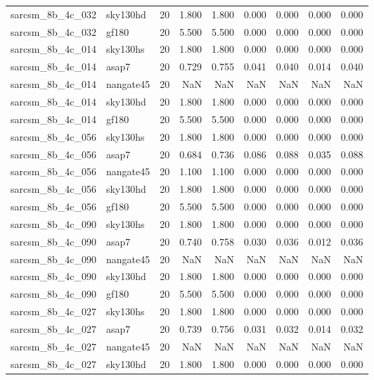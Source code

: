 \begin{tabular}{llrrrrrrr}
sarcsm\_8b\_4c\_032 & sky130hd & 20 & 1.800 & 1.800 & 0.000 & 0.000 & 0.000 & 0.000 \\
sarcsm\_8b\_4c\_032 & gf180 & 20 & 5.500 & 5.500 & 0.000 & 0.000 & 0.000 & 0.000 \\
sarcsm\_8b\_4c\_014 & sky130hs & 20 & 1.800 & 1.800 & 0.000 & 0.000 & 0.000 & 0.000 \\
sarcsm\_8b\_4c\_014 & asap7 & 20 & 0.729 & 0.755 & 0.041 & 0.040 & 0.014 & 0.040 \\
sarcsm\_8b\_4c\_014 & nangate45 & 20 & NaN & NaN & NaN & NaN & NaN & NaN \\
sarcsm\_8b\_4c\_014 & sky130hd & 20 & 1.800 & 1.800 & 0.000 & 0.000 & 0.000 & 0.000 \\
sarcsm\_8b\_4c\_014 & gf180 & 20 & 5.500 & 5.500 & 0.000 & 0.000 & 0.000 & 0.000 \\
sarcsm\_8b\_4c\_056 & sky130hs & 20 & 1.800 & 1.800 & 0.000 & 0.000 & 0.000 & 0.000 \\
sarcsm\_8b\_4c\_056 & asap7 & 20 & 0.684 & 0.736 & 0.086 & 0.088 & 0.035 & 0.088 \\
sarcsm\_8b\_4c\_056 & nangate45 & 20 & 1.100 & 1.100 & 0.000 & 0.000 & 0.000 & 0.000 \\
sarcsm\_8b\_4c\_056 & sky130hd & 20 & 1.800 & 1.800 & 0.000 & 0.000 & 0.000 & 0.000 \\
sarcsm\_8b\_4c\_056 & gf180 & 20 & 5.500 & 5.500 & 0.000 & 0.000 & 0.000 & 0.000 \\
sarcsm\_8b\_4c\_090 & sky130hs & 20 & 1.800 & 1.800 & 0.000 & 0.000 & 0.000 & 0.000 \\
sarcsm\_8b\_4c\_090 & asap7 & 20 & 0.740 & 0.758 & 0.030 & 0.036 & 0.012 & 0.036 \\
sarcsm\_8b\_4c\_090 & nangate45 & 20 & NaN & NaN & NaN & NaN & NaN & NaN \\
sarcsm\_8b\_4c\_090 & sky130hd & 20 & 1.800 & 1.800 & 0.000 & 0.000 & 0.000 & 0.000 \\
sarcsm\_8b\_4c\_090 & gf180 & 20 & 5.500 & 5.500 & 0.000 & 0.000 & 0.000 & 0.000 \\
sarcsm\_8b\_4c\_027 & sky130hs & 20 & 1.800 & 1.800 & 0.000 & 0.000 & 0.000 & 0.000 \\
sarcsm\_8b\_4c\_027 & asap7 & 20 & 0.739 & 0.756 & 0.031 & 0.032 & 0.014 & 0.032 \\
sarcsm\_8b\_4c\_027 & nangate45 & 20 & NaN & NaN & NaN & NaN & NaN & NaN \\
sarcsm\_8b\_4c\_027 & sky130hd & 20 & 1.800 & 1.800 & 0.000 & 0.000 & 0.000 & 0.000 \\

\end{tabular}
